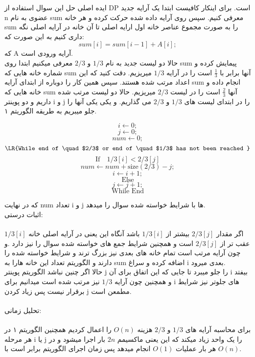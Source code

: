 \problem{}
ایده اصلی حل این سوال استفاده از DP است.
برای اینکار کافیست ابتدا یک آرایه جدید n عضوی به نام sum 
معرفی کنیم.
سپس روی آرایه داده شده حرکت کرده و هر خانه sum را به صورت مجموع عناصر خانه
اول ارایه اصلی تا آن خانه در آرایه اصلی نگه داری کنیم به این صورت که:\\
\[
    sum[i] = sum[i-1]+A[i];
\]
که A آرایه ورودی است.\\
حالا دو لیست جدید به نام $1/3$ و $2/3$ معرفی میکنیم
ابتدا روی sum پیمایش کرده و شماره خانه هایی که sum آنها برابر با $\frac{1}{3}$ است را
در آرایه $1/3$ میریزیم.
دقت کنید که این اعداد مرتب شده هستند.
سپس همین کار را دوباره از ابتدای آرایه sum انجام داده و خانه هایی که 
sum آنها $\frac{2}{3}$ است را در لیست $2/3$ میریزیم.
حالا دو لیست مرتب شده داریم و دو پوینتر i و j را در ابتدای لیست های $1/3$ و $2/3$
می گذاریم.
و یکی یکی آنها را جلو میبریم به طریقه الگوریتم ۱.


\begin{algorithm}
    \caption{}
    \[ i \gets 0; \]
    \[ j \gets 0; \]
    \[ num \gets 0;\]
      \[ \text{\LR{While end of \quad $2/3$  or  end of  \quad $1/3$  has not been reached }} \] 
        \[ \text{If} \quad 1/3[i] < 2/3[j]\]
             \[num \gets num + \text{size}(2/3) - j;\]
             \[ i \gets i + 1;\]
        \[\text{Else}\]
             \[j \gets j + 1;\]
        \[\text{While End}\]
\end{algorithm}

که در نهایت num تعداد i و j ها با شرایط خواسته شده سوال را میدهد.
\\

اثبات درستی:\\
\\
اگر مقدار $2/3[j]$ بیشتر از $1/3[i]$
باشد آنگاه 
این یعنی در آرایه اصلی خانه $1/3[i]$ عقب تر از $2/3[j]$ است و همچنین  شرایط جمع های خواسته شده
سوال را نیز دارد
.و چون آرایه مرتب است تمام خانه های بعدی نیز بزرگ ترند و شرایط خواسته شده را دارند
و الگوریتم تعداد این خانه هارا به sum اضافه کرده و سراغ i بعدی میرود.\\
حالا اگر چنین نباشد الگوریتم پوینتر j را جلو میبرد تا جایی که این اتفاق برای آن i بیفتد و 
همچنین چون آرایه $1/3$ نیز مرتب شده است میدانیم برای i های جلوتر نیز
شرایط برقرار نیست پس زیاد کردن j مطمعن است.
\\\\
تحلیل زمانی:\\\\
برای محاسبه آرایه های $1/3$ و $2/3$
هزینه $O(n)$ را اعمال کردیم همچنین الگوریتم ۱ در هر مرحله i یا j را یک واحد زیاد میکند
که این یعنی ماکسیمم $2n$ بار اجرا میشود و در هر بار عملیات $O(1)$ انجام میدهد
پس زمان اجرای الگوریتم برابر است با $O(n)$.

